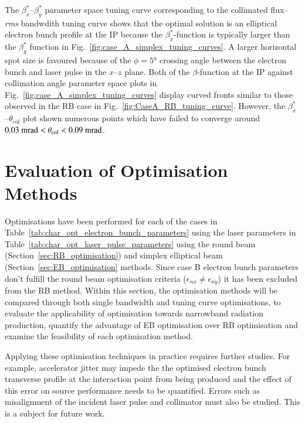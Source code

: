 \documentclass[../main.tex]{subfiles}
\begin{document}
The $\beta_{x}^{*}$--$\beta_{y}^{*}$ parameter space tuning curve corresponding to the collimated flux--\textit{rms} bandwdith tuning curve shows that the optimal solution is an elliptical electron bunch profile at the IP because the $\beta_{x}^{*}$-function is typically larger than the $\beta_{y}^{*}$ function in Fig.~\ref{fig:case_A_simplex_tuning_curves}. A larger horizontal spot size is favoured because of the $\phi = 5$\si{\degree} crossing angle between the electron bunch and laser pulse in the $x$--$z$ plane. Both of the $\beta$-function at the IP against collimation angle parameter space plots in Fig.~\ref{fig:case_A_simplex_tuning_curves} display curved fronts similar to those observed in the RB case in Fig.~\ref{fig:CaseA_RB_tuning_curve}. However, the $\beta_{x}^{*}$--$\theta_{\mathrm{col}}$ plot shown numerous points which have failed to converge around $0.03~\textrm{\si{\milli\radian}} < \theta_{\mathrm{col}} < 0.09~\mathrm{\si{\milli\radian}}$. 

\section{Evaluation of Optimisation Methods} 
\label{sec:evaluation_of_optimisation_methods}

Optimisations have been performed for each of the cases in Table~\ref{tab:char_opt_electron_bunch_parameters} using the laser parameters in Table~\ref{tab:char_opt_laser_pulse_parameters} using the round beam (Section~\ref{sec:RB_optimisation}) and simplex elliptical beam (Section~\ref{sec:EB_optimisation} methods. Since case B electron bunch parameters don't fulfill the round beam optimisation criteria ($\epsilon_{nx}\neq\epsilon_{ny}$) it has been excluded from the RB method. Within this section, the optimisation methods will be compared through both single bandwidth and tuning curve optimisations, to evaluate the applicability of optimisation towards narrowband radiation production, quantify the advantage of EB optimisation over RB optimisation and examine the feasibility of each optimisation method. 

Applying these optimisation techniques in practice requires further studies. For example, accelerator jitter may impede the the optimised electron bunch transverse profile at the interaction point from being produced and the effect of this error on source performance needs to be quantified. Errors such as misalignment of the incident laser pulse and collimator must also be studied. This is a subject for future work.  
\end{document}
